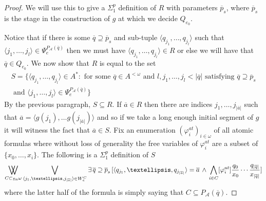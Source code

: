 \documentclass[11pt]{amsart}
\DeclareMathOperator*{\bigdoublevee}{\bigvee\mkern-15mu\bigvee}
\newcommand{\A}{{\mathcal{A}}}
\newcommand{\B}{{\mathcal{B}}}
\renewcommand{\bar}[1]{\overline{#1}}
\renewcommand{\phi}{\varphi}
\begin{document}
\begin{proof}
We will use this to give a $\Sigma^p_1$ definition of $R$ with parameters $\bar p_{s}$, where $\bar p_{s}$ is the stage in the construction of $g$ at which we decide $Q_{e_0}$.

Notice that if there is some $\bar q \supseteq \bar p_s$ and sub-tuple $\langle q_{j_1} , \dots, q_{j_l} \rangle$ such that $\langle j_1,\dots , j_l \rangle \in \Psi_e^{P_\A(\overline{q})}$ then we must have $\langle q_{j_1} , \dots, q_{j_l} \rangle \in R$ or else we will have that $\bar q \in Q_{e_0}$. We now show that $R$ is equal to the set
\begin{align*}
    S = \{ \langle q_{j_1},\dots , q_{j_l} \rangle \in A^* : \text{ for some } \bar q \in A^{< \omega} \text{ and } l , j_1, \dots , j_l < |\bar q | \text{ satisfying } \bar q \supseteq \bar p_s \\ \text{ and } \langle j_1 ,\dots , j_l \rangle \in \Psi_e^{P_\A(\bar q)}\}
\end{align*}
By the previous paragraph, $S \subseteq R$. If $\bar a \in R$ then there are indices $j_1,\dots, j_{|\bar a|}$ such that $\bar a = \langle g(j_1), \dots g(j_{|\bar a|}) \rangle$ and so if we take a long enough initial segment of $g$ it will witness the fact that $\bar a \in S$. Fix an enumeration $(\phi_i^{at})_{i\in\omega}$ of all atomic formulas where without loss of generality the free variables of $\phi_i^{at}$ are a subset of $\{x_0,\dots, x_{i}\}$. The following is a $\Sigma^p_1$ definition of $S$
\[
    \bigdoublevee_{ C \subset_{\text{fin}} \omega} \bigvee_{\langle j_1,\dots , j_{|\bar a|} \rangle \in W_e^C} \exists\, \bar q \supseteq \bar p_s \, [\langle q_{j_1}, \dots ,q_{j_{|\bar a|}} \rangle = \bar a \, \wedge \, \bigwedge_{i \in C} [\varphi^{at}_i]\frac{q_0}{x_0}\cdots\frac{q_{|\bar q|}}{x_{|\bar q|}} ]
\]
where the latter half of the formula is simply saying that $C \subseteq P_\A(\bar q)$.
\end{proof}
\end{document}
